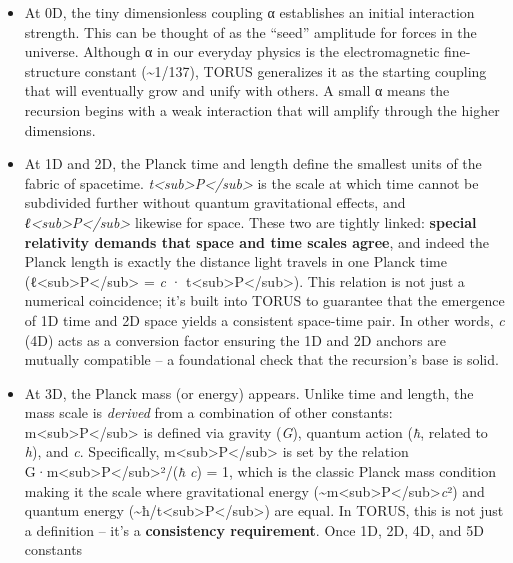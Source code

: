 \begin{itemize}
\item
  At 0D, the tiny dimensionless coupling α establishes an initial
  interaction strength. This can be thought of as the ``seed'' amplitude
  for forces in the universe. Although α in our everyday physics is the
  electromagnetic fine-structure constant (\textasciitilde{}1/137),
  TORUS generalizes it as the starting coupling that will eventually
  grow and unify with others. A small α means the recursion begins with
  a weak interaction that will amplify through the higher dimensions.
\item
  At 1D and 2D, the Planck time and length define the smallest units of
  the fabric of spacetime.
  \emph{t\textless{}sub\textgreater{}P\textless{}/sub\textgreater{}} is
  the scale at which time cannot be subdivided further without quantum
  gravitational effects, and
  \emph{ℓ\textless{}sub\textgreater{}P\textless{}/sub\textgreater{}}
  likewise for space. These two are tightly linked: \textbf{special
  relativity demands that space and time scales agree}, and indeed the
  Planck length is exactly the distance light travels in one Planck time
  (ℓ\textless{}sub\textgreater{}P\textless{}/sub\textgreater{} =
  \emph{c} ·
  t\textless{}sub\textgreater{}P\textless{}/sub\textgreater{})​. This
  relation is not just a numerical coincidence; it's built into TORUS to
  guarantee that the emergence of 1D time and 2D space yields a
  consistent space-time pair. In other words, \emph{c} (4D) acts as a
  conversion factor ensuring the 1D and 2D anchors are mutually
  compatible -- a foundational check that the recursion's base is solid.
\item
  At 3D, the Planck mass (or energy) appears. Unlike time and length,
  the mass scale is \emph{derived} from a combination of other
  constants: m\textless{}sub\textgreater{}P\textless{}/sub\textgreater{}
  is defined via gravity (\emph{G}), quantum action (\emph{ħ}, related
  to \emph{h}), and \emph{c}. Specifically,
  m\textless{}sub\textgreater{}P\textless{}/sub\textgreater{} is set by
  the relation
  G·m\textless{}sub\textgreater{}P\textless{}/sub\textgreater{}²/(\emph{ħ}
  \emph{c}) = 1, which is the classic Planck mass condition making it
  the scale where gravitational energy
  (\textasciitilde{}m\textless{}sub\textgreater{}P\textless{}/sub\textgreater{}\emph{c}²)
  and quantum energy
  (\textasciitilde{}ħ/t\textless{}sub\textgreater{}P\textless{}/sub\textgreater{})
  are equal. In TORUS, this is not just a definition -- it's a
  \textbf{consistency requirement}. Once 1D, 2D, 4D, and 5D constants

\end{itemize}
